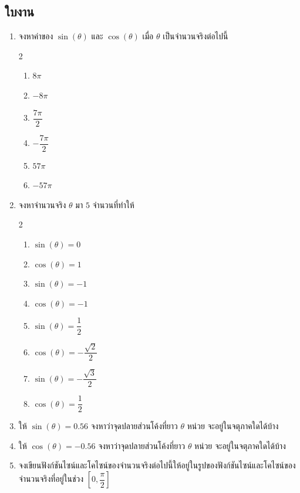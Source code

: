\subsection*{ใบงาน}
\begin{enumerate}[label=\arabic*., leftmargin=*, itemsep=1em]
 \item จงหาค่าของ $\sin \left( \theta \right)$ และ $\cos \left( \theta \right)$ เมื่อ $\theta$ เป็นจำนวนจริงต่อไปนี้
 \begin{multicols}{2}
 	\begin{enumerate}[label=\theenumi\arabic*), leftmargin=1.5em, itemsep=0.6em]
 		\everymath{\displaystyle}
 		\item $8\pi$
 		\item $-8\pi$
 		\item $\dfrac{7\pi}{2}$
 		\item $-\dfrac{7\pi}{2}$
 		\item $57\pi$
 		\item $-57\pi$
 	\end{enumerate}
 \end{multicols}
 \item จงหาจำนวนจริง $\theta$ มา $5$ จำนวนที่ทำให้
 \begin{multicols}{2}
 	\begin{enumerate}[label=\theenumi\arabic*), leftmargin=1.5em, itemsep=0.6em]
 		\everymath{\displaystyle}
 		\item $\sin \left( \theta \right) = 0$
 		\item $\cos \left( \theta \right) = 1$
 		\item $\sin \left( \theta \right) = -1$
 		\item $\cos \left( \theta \right) = -1$
 		\item $\sin \left( \theta \right) = \dfrac{1}{2}$
 		\item $\cos \left( \theta \right) = -\dfrac{\sqrt{2}}{2}$
 		\item $\sin \left( \theta \right) = -\dfrac{\sqrt{3}}{2}$
 		\item $\cos \left( \theta \right) = \dfrac{1}{2}$
 	\end{enumerate}
 \end{multicols} 
 \item ให้ $\sin \left( \theta \right) = 0.56$ จงหาว่าจุดปลายส่วนโค้งที่ยาว $\theta$ หน่วย จะอยู่ในจตุภาคใดได้บ้าง
 \item ให้ $\cos \left( \theta \right) = -0.56$ จงหาว่าจุดปลายส่วนโค้งที่ยาว $\theta$ หน่วย จะอยู่ในจตุภาคใดได้บ้าง
 \item จงเขียนฟังก์ชันไซน์และโคไซน์ของจำนวนจริงต่อไปนี้ให้อยู่ในรูปของฟังก์ชันไซน์และโคไซน์ของจำนวนจริงที่อยู่ในช่วง $\left[0, \dfrac{\pi}{2}\right]$

\end{enumerate}
